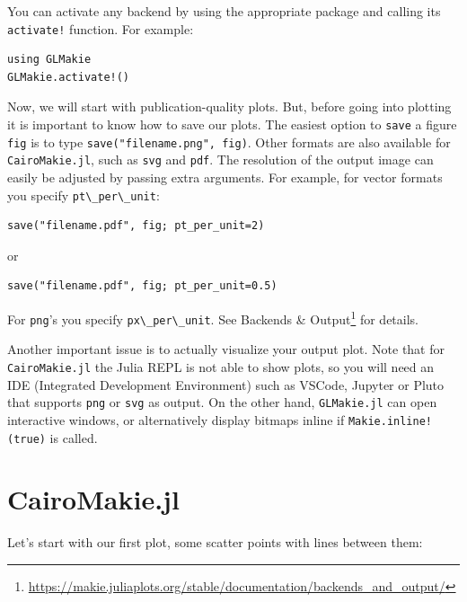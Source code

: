 \documentclass[
  notoc %
]{tufte-book}
\DeclareRobustCommand{\href}[2]{#2\footnote{\url{#1}}}
\newcommand{\passthrough}[1]{#1}
\begin{document}
You can activate any backend by using the appropriate package and
calling its \passthrough{\lstinline"activate!"} function. For example:

\begin{lstlisting}
using GLMakie
GLMakie.activate!()
\end{lstlisting}

Now, we will start with publication-quality plots. But, before going
into plotting it is important to know how to save our plots. The easiest
option to \passthrough{\lstinline!save!} a figure
\passthrough{\lstinline!fig!} is to type
\passthrough{\lstinline!save("filename.png", fig)!}. Other formats are
also available for \passthrough{\lstinline!CairoMakie.jl!}, such as
\passthrough{\lstinline!svg!} and \passthrough{\lstinline!pdf!}. The
resolution of the output image can easily be adjusted by passing extra
arguments. For example, for vector formats you specify
\passthrough{\lstinline!pt\_per\_unit!}:

\begin{lstlisting}
save("filename.pdf", fig; pt_per_unit=2)
\end{lstlisting}

or

\begin{lstlisting}
save("filename.pdf", fig; pt_per_unit=0.5)
\end{lstlisting}

For \passthrough{\lstinline!png!}'s you specify
\passthrough{\lstinline!px\_per\_unit!}. See
\href{https://makie.juliaplots.org/stable/documentation/backends_and_output/}{Backends
\& Output} for details.

Another important issue is to actually visualize your output plot. Note
that for \passthrough{\lstinline!CairoMakie.jl!} the Julia REPL is not
able to show plots, so you will need an IDE (Integrated Development
Environment) such as VSCode, Jupyter or Pluto that supports
\passthrough{\lstinline!png!} or \passthrough{\lstinline!svg!} as
output. On the other hand, \passthrough{\lstinline!GLMakie.jl!} can open
interactive windows, or alternatively display bitmaps inline if
\passthrough{\lstinline"Makie.inline!(true)"} is called.

\hypertarget{sec:cairomakie}{%
\section{CairoMakie.jl}\label{sec:cairomakie}}

Let's start with our first plot, some scatter points with lines between
them:
\end{document}
